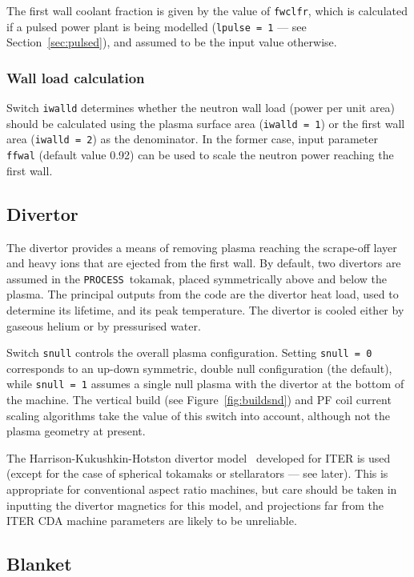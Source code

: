 \documentclass[11pt,a4paper]{report}
\newcommand{\process}{\mbox{\texttt{PROCESS}}}
\begin{document}
The first wall coolant fraction is given by the value of \texttt{fwclfr},
which is calculated if a pulsed power plant is being modelled (\texttt{lpulse
  = 1} --- see Section~\ref{sec:pulsed}), and assumed to be the input value
otherwise.

\subsubsection*{Wall load calculation}

Switch \texttt{iwalld} determines whether the neutron wall load (power per
unit area) should be calculated using the plasma surface area (\texttt{iwalld
  = 1}) or the first wall area (\texttt{iwalld = 2}) as the denominator. In
the former case, input parameter \texttt{ffwal} (default value 0.92)
can be used to scale the neutron power reaching the first wall.

\subsection{Divertor}
\label{sec:divertor}

The divertor provides a means of removing plasma reaching the scrape-off layer
and heavy ions that are ejected from the first wall.  By default, two
divertors are assumed in the \process\ tokamak, placed symmetrically above
and below the plasma. The principal outputs from the code are the divertor
heat load, used to determine its lifetime, and its peak temperature. The
divertor is cooled either by gaseous helium or by pressurised water.

Switch \texttt{snull} controls the overall plasma configuration. Setting
\texttt{snull = 0} corresponds to an up-down symmetric, double null
configuration (the default), while \texttt{snull = 1} assumes a single null
plasma with the divertor at the bottom of the machine. The vertical build (see
Figure~\ref{fig:buildsnd}) and PF coil current scaling algorithms take the
value of this switch into account, although not the plasma geometry at
present.

The Harrison-Kukushkin-Hotston divertor model~\cite{IPDG} developed for ITER
is used (except for the case of spherical tokamaks or stellarators --- see
later). This is appropriate for conventional aspect ratio machines, but care
should be taken in inputting the divertor magnetics for this model, and
projections far from the ITER CDA machine parameters are likely to be
unreliable.

\subsection{Blanket}
\end{document}
